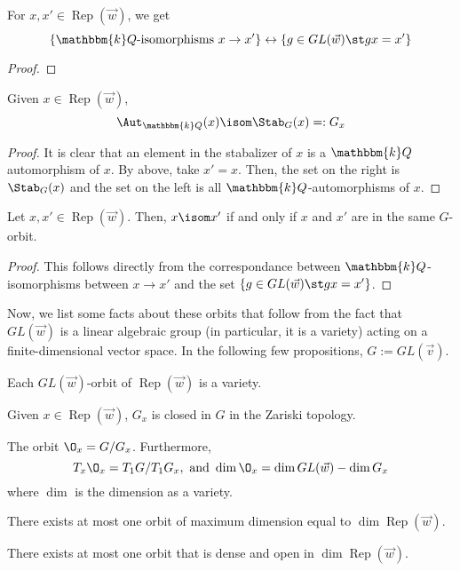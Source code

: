 \documentclass[11pt,leqno,oneside]{amsbook}
\numberwithin{thm}{section}
\newcommand{\bbk}{\mathbbm{k}} %
\newcommand{\Rep}{\operatorname{Rep}} %
\renewcommand{\Q}{Q} %
\begin{document}
\begin{prop}
  For \(x,x' \in \Rep(\vec{w})\), we get \[
    \{\bbk \Q\text{-isomorphisms } x \to x'\} \leftrightarrow \{g \in
    GL(\vec{w}) \st gx = x'\}
  \]
\end{prop}
\begin{proof}
\end{proof}
\begin{cor}
  Given \(x \in \Rep(\vec{w})\), \[
    \Aut_{\bbk \Q}(x) \isom \Stab_G(x) =: G_x
  \]
\end{cor}
\begin{proof}
  It is clear that an element in the stabalizer of \(x\) is a \(\bbk \Q\)
  automorphism of \(x\). By above, take \(x' = x\). Then, the set on
  the right is \(\Stab_G(x)\) and the set on the left is all \(\bbk
  \Q\)-automorphisms of \(x\).
\end{proof}
\begin{prop}
  Let \(x,x' \in \Rep(\vec{w})\). Then, \(x \isom x'\) if and only if
  \(x\) and \(x'\) are in the same \(G\)-orbit.
\end{prop}
\begin{proof}
  This follows directly from the correspondance between \(\bbk
  \Q\)-isomorphisms between \(x \to x'\) and the set \(\{g \in
  GL(\vec{w}) \st gx = x'\}\).
\end{proof}
Now, we list some facts about these orbits that follow from the fact
that \(GL(\vec{w})\) is a linear algebraic group (in particular, it is
a variety) acting on a
finite-dimensional vector space. In the following few propositions,
\(G := GL(\vec{v})\).
\begin{prop}
  Each \(GL(\vec{w})\)-orbit of \(\Rep(\vec{w})\) is a variety.
\end{prop}
\begin{prop}
  Given \(x \in \Rep(\vec{w})\), \(G_x\) is closed in \(G\) in the
  Zariski topology.
\end{prop}
\begin{prop}\label{dim-of-orbit}
  The orbit \(\O_x = G/G_x\). Furthermore, \[
    T_x \O_x = T_1 G / T_1 G_x, \ \text{and} \ \dim \O_x = \dim
    GL(\vec{w}) - \dim G_x
  \]
  where \(\dim\) is the dimension as a variety. 
\end{prop}
\begin{prop}
  There exists at most one orbit of maximum dimension equal to \(\dim
  \Rep(\vec{w})\). 
\end{prop}
\begin{cor} \label{only-one-open-and-dense}
  There exists at most one orbit that is dense and open in \(\dim
  \Rep(\vec{w})\). 
\end{cor}
\end{document}
